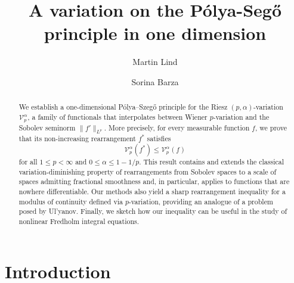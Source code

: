 \documentclass{amsart}
\title[Variational P\'{o}lya-Seg\H{o} principle]{A variation on the P\'{o}lya-Seg\H{o} principle in one dimension}
\author{Martin Lind}
\author{Sorina Barza}
\numberwithin{equation}{section}
\begin{document}
\begin{abstract}
    We establish a one-dimensional P\'{o}lya–Szeg\H{o} principle for the Riesz $(p,\alpha)$-variation $\mathcal{V}_p^\alpha$, a family of functionals that interpolates between Wiener $p$-variation and the Sobolev seminorm $\|f'\|_{L^p}$. More precisely, for every measurable function $f$, we prove that its non-increasing rearrangement $f^*$ satisfies 
    $$
    \mathcal{V}_p^\alpha(f^*)\le\mathcal{V}_p^\alpha(f)
    $$ 
    for all $1\le p<\infty$ and $0\le\alpha\le 1-1/p$.
    This result contains and extends the classical variation-diminishing property of rearrangements from Sobolev spaces to a scale of spaces admitting fractional smoothness and, in particular, applies to functions that are nowhere differentiable. Our methods also yield a sharp rearrangement inequality for a modulus of continuity defined via $p$-variation, providing an analogue of a problem posed by Ul'yanov. Finally, we sketch how our inequality can be useful in the study of nonlinear Fredholm integral equations.
\end{abstract}
\maketitle

\section{Introduction}
\end{document}
